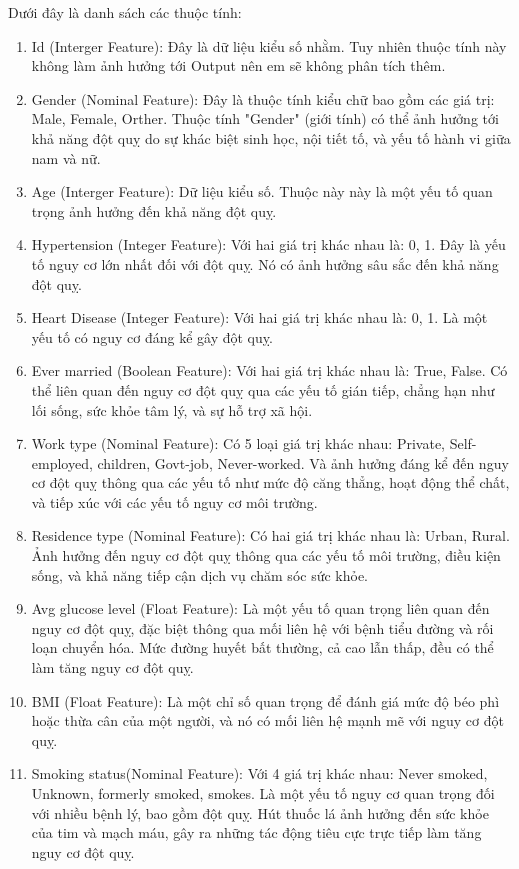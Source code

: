 \documentclass[11pt]{article}
\begin{document}
	Dưới đây là danh sách các thuộc tính:
	\begin{enumerate}
		\item Id (Interger Feature): Đây là dữ liệu kiểu số nhằm. Tuy nhiên thuộc tính này không làm ảnh hưởng tới Output nên em sẽ không phân tích thêm.
		\item Gender (Nominal Feature): Đây là thuộc tính kiểu chữ bao gồm các giá trị: Male, Female, Orther. Thuộc tính "Gender" (giới tính) có thể ảnh hưởng tới khả năng đột quỵ do sự khác biệt sinh học, nội tiết tố, và yếu tố hành vi giữa nam và nữ.
		\item Age (Interger Feature): Dữ liệu kiểu số. Thuộc này này là một yếu tố quan trọng ảnh hưởng đến khả năng đột quỵ.
		\item Hypertension (Integer Feature): Với hai giá trị khác nhau là: 0, 1.
		Đây là yếu tố nguy cơ lớn nhất đối với đột quỵ. Nó có ảnh hưởng sâu sắc đến khả năng đột quỵ.
		\item Heart Disease (Integer Feature): Với hai giá trị khác nhau là: 0, 1. Là một yếu tố có nguy cơ đáng kể gây đột quỵ. 
		\item Ever married (Boolean Feature): Với hai giá trị khác nhau là: True, False. Có thể liên quan đến nguy cơ đột quỵ qua các yếu tố gián tiếp, chẳng hạn như lối sống, sức khỏe tâm lý, và sự hỗ trợ xã hội.
		\item Work type (Nominal Feature): Có 5 loại giá trị khác nhau: Private, Self-employed, children, Govt-job, Never-worked. Và ảnh hưởng đáng kể đến nguy cơ đột quỵ thông qua các yếu tố như mức độ căng thẳng, hoạt động thể chất, và tiếp xúc với các yếu tố nguy cơ môi trường.
		\item Residence type (Nominal Feature): Có hai giá trị khác nhau là: Urban, Rural. Ảnh hưởng đến nguy cơ đột quỵ thông qua các yếu tố môi trường, điều kiện sống, và khả năng tiếp cận dịch vụ chăm sóc sức khỏe.
		\item Avg glucose level (Float Feature): Là một yếu tố quan trọng liên quan đến nguy cơ đột quỵ, đặc biệt thông qua mối liên hệ với bệnh tiểu đường và rối loạn chuyển hóa. Mức đường huyết bất thường, cả cao lẫn thấp, đều có thể làm tăng nguy cơ đột quỵ.
		\item BMI (Float Feature): Là một chỉ số quan trọng để đánh giá mức độ béo phì hoặc thừa cân của một người, và nó có mối liên hệ mạnh mẽ với nguy cơ đột quỵ.
		\item Smoking status(Nominal Feature): Với 4 giá trị khác nhau: Never smoked, Unknown, formerly smoked, smokes. Là một yếu tố nguy cơ quan trọng đối với nhiều bệnh lý, bao gồm đột quỵ. Hút thuốc lá ảnh hưởng đến sức khỏe của tim và mạch máu, gây ra những tác động tiêu cực trực tiếp làm tăng nguy cơ đột quỵ. 
	\end{enumerate}
	
\end{document}
